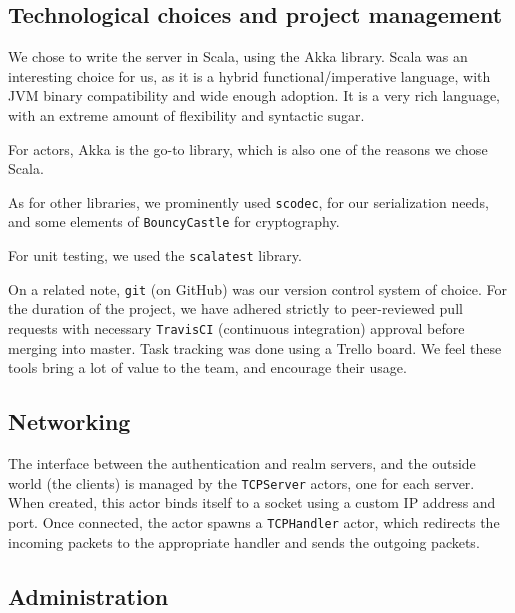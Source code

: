 \documentclass[paper=a4, fontsize=11pt]{scrartcl}
\begin{document}

\subsection{Technological choices and project management}

We chose to write the server in Scala, using the Akka library.
Scala was an interesting choice for us, as it is a hybrid functional/imperative
language, with JVM binary compatibility and wide enough adoption.
It is a very rich language, with an extreme amount of flexibility and syntactic
sugar.

For actors, Akka is the go-to library, which is also one of the reasons we chose
Scala.

As for other libraries, we prominently used \texttt{scodec}, for our
serialization needs, and some elements of \texttt{BouncyCastle} for
cryptography.

For unit testing, we used the \texttt{scalatest} library.

On a related note, \texttt{git} (on GitHub) was our version control system of
choice.  For the duration of the project, we have adhered strictly to
peer-reviewed pull requests with necessary \texttt{TravisCI} (continuous
integration) approval before merging into master.
Task tracking was done using a Trello board.
We feel these tools bring a lot of value to the team, and encourage their usage.

\subsection{Networking}

The interface between the authentication and realm servers, and the outside
world (the clients) is managed by the \texttt{TCPServer} actors, one for each
server. 
When created, this actor binds itself to a socket using a custom IP address and
port.
Once connected, the actor spawns a \texttt{TCPHandler} actor, which redirects the
incoming packets to the appropriate handler and sends the outgoing packets.


\subsection{Administration}
\end{document}
